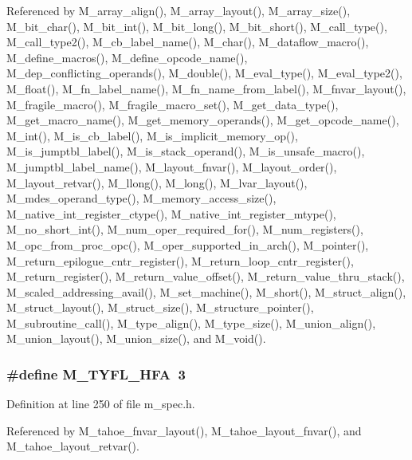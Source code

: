 Referenced by M\_\-array\_\-align(), M\_\-array\_\-layout(), M\_\-array\_\-size(), M\_\-bit\_\-char(), M\_\-bit\_\-int(), M\_\-bit\_\-long(), M\_\-bit\_\-short(), M\_\-call\_\-type(), M\_\-call\_\-type2(), M\_\-cb\_\-label\_\-name(), M\_\-char(), M\_\-dataflow\_\-macro(), M\_\-define\_\-macros(), M\_\-define\_\-opcode\_\-name(), M\_\-dep\_\-conflicting\_\-operands(), M\_\-double(), M\_\-eval\_\-type(), M\_\-eval\_\-type2(), M\_\-float(), M\_\-fn\_\-label\_\-name(), M\_\-fn\_\-name\_\-from\_\-label(), M\_\-fnvar\_\-layout(), M\_\-fragile\_\-macro(), M\_\-fragile\_\-macro\_\-set(), M\_\-get\_\-data\_\-type(), M\_\-get\_\-macro\_\-name(), M\_\-get\_\-memory\_\-operands(), M\_\-get\_\-opcode\_\-name(), M\_\-int(), M\_\-is\_\-cb\_\-label(), M\_\-is\_\-implicit\_\-memory\_\-op(), M\_\-is\_\-jumptbl\_\-label(), M\_\-is\_\-stack\_\-operand(), M\_\-is\_\-unsafe\_\-macro(), M\_\-jumptbl\_\-label\_\-name(), M\_\-layout\_\-fnvar(), M\_\-layout\_\-order(), M\_\-layout\_\-retvar(), M\_\-llong(), M\_\-long(), M\_\-lvar\_\-layout(), M\_\-mdes\_\-operand\_\-type(), M\_\-memory\_\-access\_\-size(), M\_\-native\_\-int\_\-register\_\-ctype(), M\_\-native\_\-int\_\-register\_\-mtype(), M\_\-no\_\-short\_\-int(), M\_\-num\_\-oper\_\-required\_\-for(), M\_\-num\_\-registers(), M\_\-opc\_\-from\_\-proc\_\-opc(), M\_\-oper\_\-supported\_\-in\_\-arch(), M\_\-pointer(), M\_\-return\_\-epilogue\_\-cntr\_\-register(), M\_\-return\_\-loop\_\-cntr\_\-register(), M\_\-return\_\-register(), M\_\-return\_\-value\_\-offset(), M\_\-return\_\-value\_\-thru\_\-stack(), M\_\-scaled\_\-addressing\_\-avail(), M\_\-set\_\-machine(), M\_\-short(), M\_\-struct\_\-align(), M\_\-struct\_\-layout(), M\_\-struct\_\-size(), M\_\-structure\_\-pointer(), M\_\-subroutine\_\-call(), M\_\-type\_\-align(), M\_\-type\_\-size(), M\_\-union\_\-align(), M\_\-union\_\-layout(), M\_\-union\_\-size(), and M\_\-void().
\subsubsection{\setlength{\rightskip}{0pt plus 5cm}\#define M\_\-TYFL\_\-HFA~3}\label{m__spec_8h_1d4941f4df28baf7fa882ed7aacf13ab}




Definition at line 250 of file m\_\-spec.h.

Referenced by M\_\-tahoe\_\-fnvar\_\-layout(), M\_\-tahoe\_\-layout\_\-fnvar(), and M\_\-tahoe\_\-layout\_\-retvar().
